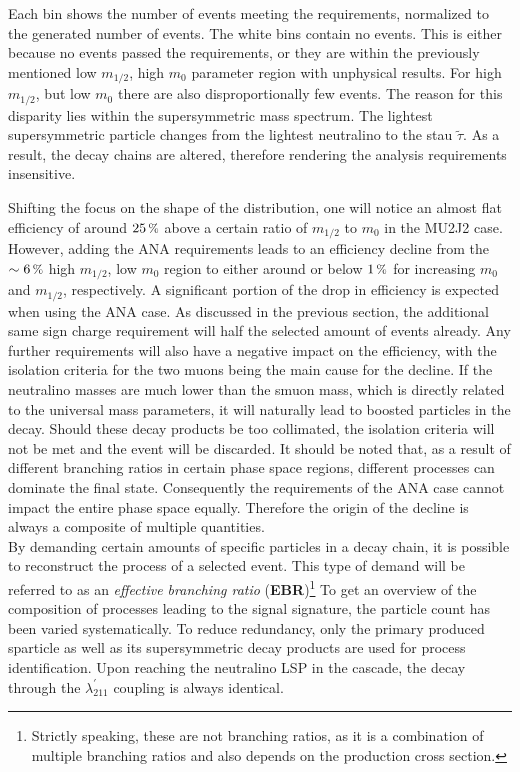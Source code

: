 \noindent Each bin shows the number of events meeting the requirements, normalized to the generated number of events. The white bins contain no events. This is either because no events passed the requirements, or they are within the previously mentioned low $m_{1/2}$, high $m_0$ parameter region with unphysical results. For high $m_{1/2}$, but low $m_0$ there are also disproportionally few events. The reason for this disparity lies within the supersymmetric mass spectrum. The lightest supersymmetric particle changes from the lightest neutralino to the stau $\tilde{\tau}$. As a result, the decay chains are altered, therefore rendering the analysis requirements insensitive. 

Shifting the focus on the shape of the distribution, one will notice an almost flat efficiency of around $25\,\pct$ above a certain ratio of $m_{1/2}$ to $m_0$ in the MU2J2 case. However, adding the ANA requirements leads to an efficiency decline from the $\sim 6\,\pct$ high $m_{1/2}$, low $m_0$ region to either around or below $1\,\pct$ for increasing $m_0$ and $m_{1/2}$, respectively. A significant portion of the drop in efficiency is expected when using the ANA case. As discussed in the previous section, the additional same sign charge requirement will half the selected amount of events already. Any further requirements will also have a negative impact on the efficiency, with the isolation criteria for the two muons being the main cause for the decline. If the neutralino masses are much lower than the smuon mass, which is directly related to the universal mass parameters, it will naturally lead to boosted particles in the decay. Should these decay products be too collimated, the isolation criteria will not be met and the event will be discarded. It should be noted that, as a result of different branching ratios in certain phase space regions, different processes can dominate the final state. Consequently the requirements of the ANA case cannot impact the entire phase space equally. Therefore the origin of the decline is always a composite of multiple quantities. \\

By demanding certain amounts of specific particles in a decay chain, it is possible to reconstruct the process of a selected event. This type of demand will be referred to as an \textit{effective branching ratio} (\textbf{EBR})\footnote{Strictly speaking, these are not branching ratios, as it is a combination of multiple branching ratios and also depends on the production cross section.} To get an overview of the composition of processes leading to the signal signature, the particle count has been varied systematically. To reduce redundancy, only the primary produced sparticle as well as its supersymmetric decay products are used for process identification. Upon reaching the neutralino LSP in the cascade, the decay through the $\lambda^\prime_{211}$ coupling is always identical.

